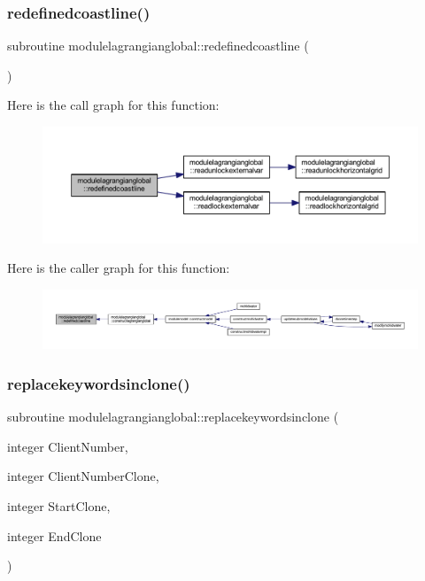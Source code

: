 \subsubsection{\texorpdfstring{redefinedcoastline()}{redefinedcoastline()}}
{\footnotesize\ttfamily subroutine modulelagrangianglobal\+::redefinedcoastline (\begin{DoxyParamCaption}{ }\end{DoxyParamCaption})\hspace{0.3cm}{\ttfamily [private]}}

Here is the call graph for this function\+:\nopagebreak
\begin{figure}[H]
\begin{center}
\leavevmode
\includegraphics[width=350pt]{namespacemodulelagrangianglobal_a83377eb734750e27543838294b2cf44d_cgraph}
\end{center}
\end{figure}
Here is the caller graph for this function\+:\nopagebreak
\begin{figure}[H]
\begin{center}
\leavevmode
\includegraphics[width=350pt]{namespacemodulelagrangianglobal_a83377eb734750e27543838294b2cf44d_icgraph}
\end{center}
\end{figure}
\mbox{\label{namespacemodulelagrangianglobal_a9d7ee93eda9bae199e15651c725e4c7c}} 
\subsubsection{\texorpdfstring{replacekeywordsinclone()}{replacekeywordsinclone()}}
{\footnotesize\ttfamily subroutine modulelagrangianglobal\+::replacekeywordsinclone (\begin{DoxyParamCaption}\item[{integer}]{Client\+Number,  }\item[{integer}]{Client\+Number\+Clone,  }\item[{integer}]{Start\+Clone,  }\item[{integer}]{End\+Clone }\end{DoxyParamCaption})\hspace{0.3cm}{\ttfamily [private]}}

